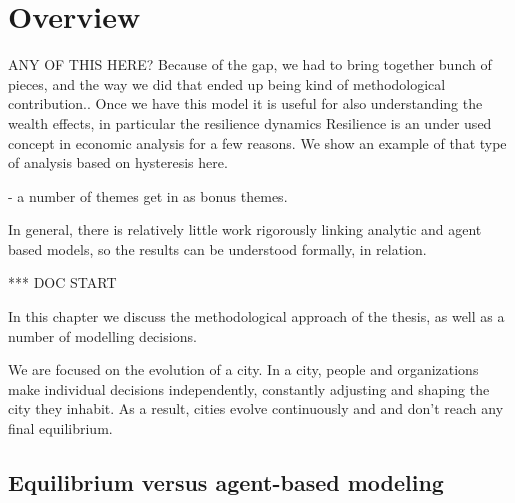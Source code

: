 \section{Overview}

ANY OF THIS HERE?
Because of the gap, we had to bring together bunch of pieces, and the way we did that ended up being kind of methodological contribution..
Once we have this model it is useful for also understanding the wealth effects, in particular the resilience dynamics
Resilience is an under used concept in economic analysis for a few reasons. We show an example of that type of analysis based on hysteresis here. 

- a number of themes get in as bonus themes.

In general, there is relatively little work rigorously linking analytic and agent based models, so the results can be understood formally, in relation. %

***
DOC START

In this chapter we discuss the methodological approach of the thesis, as well as a number of modelling decisions. 


We are focused on the evolution of a city. In a city, people and organizations make individual decisions independently, constantly adjusting and shaping the city they inhabit. As a result, cities evolve continuously and and don't reach any final equilibrium. 

\subsection{Equilibrium versus agent-based modeling}

